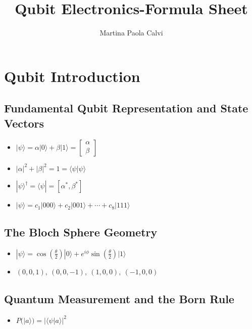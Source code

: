 \documentclass{article}
\title{Qubit Electronics-Formula Sheet}
\author{Martina Paola Calvi}
\date{}
\begin{document}
\maketitle
\section{Qubit Introduction}
\subsection*{Fundamental Qubit Representation and State Vectors}
\begin{itemize}
    \item $|\psi\rangle = \alpha|0\rangle + \beta|1\rangle = \begin{bmatrix} \alpha \\ \beta \end{bmatrix}$
    \item $|\alpha|^2 + |\beta|^2 = 1 = \langle\psi|\psi\rangle$
    \item $|\psi\rangle^\dagger = \langle\psi| = [\alpha^*, \beta^*]$
    \item $|\psi\rangle = c_1|000\rangle + c_2|001\rangle + \cdots + c_8|111\rangle$
\end{itemize}

\subsection*{The Bloch Sphere Geometry}
    \begin{itemize}
    \item $|\psi\rangle = \cos\left(\frac{\theta}{2}\right)|0\rangle + e^{i\phi}\sin\left(\frac{\theta}{2}\right)|1\rangle$
    \item $(0,0,1),\ (0,0,-1),\ (1,0,0),\ (-1,0,0)$
\end{itemize}

\subsection*{Quantum Measurement and the Born Rule}
\begin{itemize}
    \item $P(|a\rangle) = |\langle \psi|a \rangle|^2$
\end{itemize}
\end{document}
